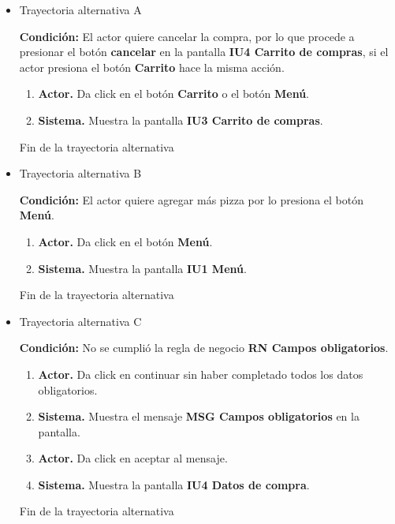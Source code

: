 \begin{itemize}
	
	\item \hypertarget{CU3:TAA}{Trayectoria alternativa A}
	
	\noindent \textbf{Condición:} El actor quiere cancelar la compra, por lo que procede a presionar el botón \textbf{cancelar} en la pantalla \textbf{IU4 Carrito de compras}, si el actor presiona el botón \textbf{Carrito} hace la misma acción.
	
	\begin{enumerate}
		\item \textbf{Actor.} Da click en el botón \textbf{Carrito} o el botón \textbf{Menú}.
		\item \textbf{Sistema.} Muestra la pantalla \textbf{IU3 Carrito de compras}.
	\end{enumerate}
	
	Fin de la trayectoria alternativa
	
	\item \hypertarget{CU3:TAB}{Trayectoria alternativa B}
	
	\noindent \textbf{Condición:} El actor quiere agregar más pizza por lo presiona el botón \textbf{Menú}.
	
	\begin{enumerate}
		\item \textbf{Actor.} Da click en el botón \textbf{Menú}.
		\item \textbf{Sistema.} Muestra la pantalla \textbf{IU1 Menú}.
	\end{enumerate}
	
	Fin de la trayectoria alternativa
	
	\item \hypertarget{CU3:TAC}{Trayectoria alternativa C}
	
	\noindent \textbf{Condición:} No se cumplió la regla de negocio \textbf{RN Campos obligatorios}.
	
	\begin{enumerate}
		\item \textbf{Actor.} Da click en continuar sin haber completado todos los datos obligatorios.
		\item \textbf{Sistema.} Muestra el mensaje \textbf{MSG Campos obligatorios} en la pantalla.
		\item \textbf{Actor.} Da click en aceptar al mensaje.
		\item \textbf{Sistema.} Muestra la pantalla \textbf{IU4 Datos de compra}.
	\end{enumerate}
	
	Fin de la trayectoria alternativa
	
\end{itemize}

